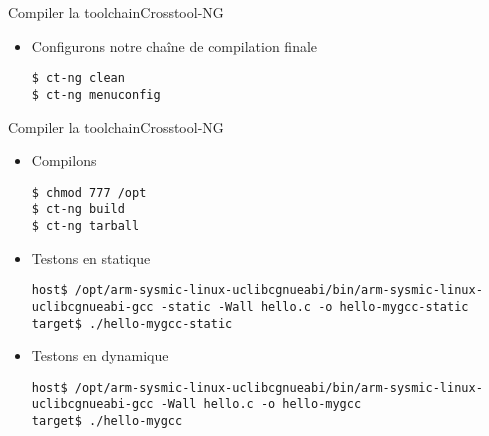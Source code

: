 \begin{frame}[fragile=singleslide]{Compiler la toolchain}{Crosstool-NG}
  \begin{itemize}
  \item Configurons notre chaîne de compilation finale
    \begin{lstlisting}
$ ct-ng clean 
$ ct-ng menuconfig
       \end{lstlisting}
  \end{itemize}
\end{frame}

\begin{frame}[fragile=singleslide]{Compiler la toolchain}{Crosstool-NG}
  \begin{itemize}
     \item Compilons
       \begin{lstlisting}
$ chmod 777 /opt
$ ct-ng build
$ ct-ng tarball
       \end{lstlisting}
     \item Testons en statique
       \begin{lstlisting}[basicstyle=\ttfamily\scriptsize\color{colBasic}]
host$ /opt/arm-sysmic-linux-uclibcgnueabi/bin/arm-sysmic-linux-uclibcgnueabi-gcc -static -Wall hello.c -o hello-mygcc-static
target$ ./hello-mygcc-static
       \end{lstlisting}
     \item Testons en dynamique
       \begin{lstlisting}[basicstyle=\ttfamily\scriptsize\color{colBasic}]
host$ /opt/arm-sysmic-linux-uclibcgnueabi/bin/arm-sysmic-linux-uclibcgnueabi-gcc -Wall hello.c -o hello-mygcc
target$ ./hello-mygcc
	\end{lstlisting}
  \end{itemize}
\end{frame}

